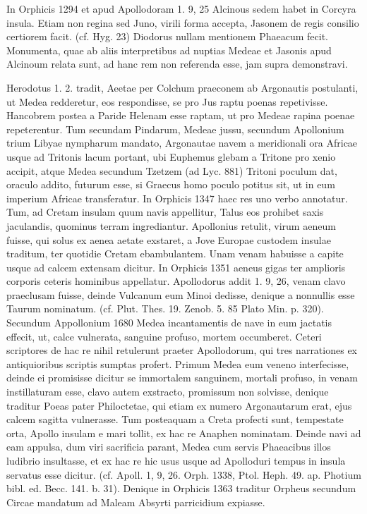 \documentclass[a4paper, 11pt, oneside, polutonikogreek, german]{article}
\begin{document}
In Orphicis 1294 et apud Apollodoram 1. 9, 25 Alcinous sedem habet in Corcyra insula. Etiam non regina sed Juno, virili forma accepta, Jasonem de regis consilio certiorem facit. (cf. Hyg. 23) Diodorus nullam mentionem Phaeacum fecit. Monumenta, quae ab aliis interpretibus ad nuptias Medeae et Jasonis apud Alcinoum relata sunt, ad hanc rem non referenda esse, jam supra demonstravi.

Herodotus 1. 2. tradit, Aeetae per Colchum praeconem ab Argonautis postulanti, ut Medea redderetur, eos respondisse, se pro Jus raptu poenas repetivisse. Hancobrem postea a Paride Helenam esse raptam, ut pro Medeae rapina poenae repeterentur. Tum secundam Pindarum, Medeae jussu, secundum Apollonium trium Libyae nympharum mandato, Argonautae navem a meridionali ora Africae usque ad Tritonis lacum portant, ubi Euphemus glebam a Tritone pro xenio accipit, atque Medea secundum Tzetzem (ad Lyc. 881) Tritoni poculum dat, oraculo addito, futurum esse, si Graecus homo poculo potitus sit, ut in eum imperium Africae transferatur. In Orphicis 1347 haec res uno verbo annotatur. Tum, ad Cretam insulam quum navis appellitur, Talus eos prohibet saxis jaculandis, quominus terram ingrediantur. Apollonius retulit, virum aeneum fuisse, qui solus ex aenea aetate exstaret, a Jove Europae custodem insulae traditum, ter quotidie Cretam ebambulantem. Unam venam habuisse a capite usque ad calcem extensam dicitur. In Orphicis 1351 aeneus gigas ter amplioris corporis ceteris hominibus appellatur. Apollodorus addit 1. 9, 26, venam clavo praeclusam fuisse, deinde Vulcanum eum Minoi dedisse, denique a nonnullis esse Taurum nominatum. (cf. Plut. Thes. 19. Zenob. 5. 85 Plato Min. p. 320). Secundum Appollonium 1680 Medea incantamentis de nave in eum jactatis effecit, ut, calce vulnerata, sanguine profuso, mortem occumberet. Ceteri scriptores de hac re nihil retulerunt praeter Apollodorum, qui tres narrationes ex antiquioribus scriptis sumptas profert. Primum Medea eum veneno interfecisse, deinde ei promisisse dicitur se immortalem sanguinem, mortali profuso, in venam instillaturam esse, clavo autem exstracto, promissum non solvisse, denique traditur Poeas pater Philoctetae, qui etiam ex numero Argonautarum erat, ejus calcem sagitta vulnerasse. Tum posteaquam a Creta profecti sunt, tempestate orta, Apollo insulam e mari tollit, ex hac re Anaphen nominatam. Deinde navi ad eam appulsa, dum viri sacrificia parant, Medea cum servis Phaeacibus illos ludibrio insultasse, et ex hac re hic usus usque ad Apolloduri tempus in insula servatus esse dicitur. (cf. Apoll. 1, 9, 26. Orph. 1338, Ptol. Heph. 49. ap. Photium bibl. ed. Becc. 141. b. 31). Denique in Orphicis 1363 traditur Orpheus secundum Circae mandatum ad Maleam Absyrti parricidium expiasse.
\end{document}
